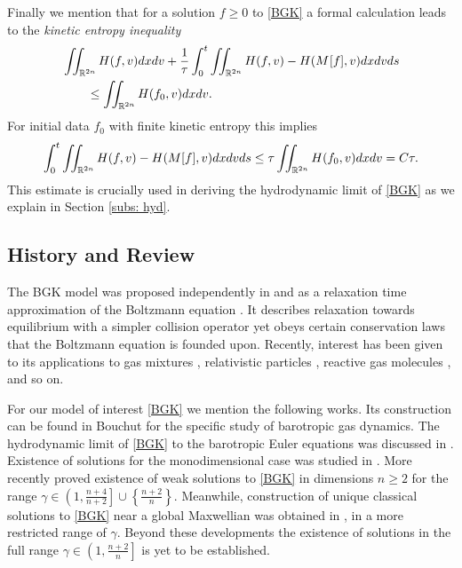 \documentclass{amsart}
\theoremstyle{plain}
\theoremstyle{remark}
\numberwithin{equation}{section}
\newcommand{\R}{\mathbb{R}}
\newcommand{\dx}{\textnormal{d}x}
\newcommand{\dv}{\textnormal{d}v}
\newcommand{\ds}{\textnormal{d}s}
\begin{document}
Finally we mention that for a solution $f\ge 0$ to \eqref{BGK} a formal calculation leads to the \emph{kinetic entropy inequality}
\begin{equation}
    \label{eq : kin entrop ineq}
    \begin{split}
          &\iint_{\R^{2n}} H(f,v)\dx \dv + \frac{1}{\tau}\int_0^t \iint_{\R^{2n}} H(f,v)-H(M^{}[f],v) \dx \dv \ds\\
          &\qquad \le \iint_{\R^{2n}}H(f_0,v)\dx\dv.
        \end{split}
\end{equation}
For initial data $f_0$ with finite kinetic entropy this implies
    \begin{align}
    \label{ineq : dissipation est}
        \int_0^t \iint_{\R^{2n}} H(f,v)-H(M[f],v) \dx \dv \ds \le \tau \iint_{\R^{2n}} H(f_0,v) \dx \dv = C\tau.
    \end{align}
This estimate is crucially used in deriving the hydrodynamic limit of \eqref{BGK} as we explain in Section \ref{subs: hyd}.

\subsection{History and Review}
The BGK model was proposed independently in \cite{bhatnagargrosskrook1954} and \cite{walender1954} as a relaxation time approximation of the Boltzmann equation \cite{boltzmann1995}. It describes relaxation towards equilibrium with a simpler collision operator yet obeys certain conservation laws that the Boltzmann equation is founded upon. Recently, interest has been given to its applications to gas mixtures \cite{andriesaokiperthame2002, baeklingenbergpirneryun2021, bobylevbisigroppispigapotapenko2018, brullpavanschneider2012, klingenbergpirnerpuppo2017}, relativistic particles \cite{andersonwitting1974, pennisiruggeri2018}, reactive gas molecules \cite{kimleeyun2021}, and so on.

For our model of interest \eqref{BGK} we mention the following works. Its construction can be found in Bouchut \cite{bouchut1999} for the specific study of barotropic gas dynamics. The hydrodynamic limit of \eqref{BGK} to the barotropic Euler equations was discussed in \cite{berthelinbouchut2002,berthelinvasseur2005}. Existence of solutions for the monodimensional case was studied in \cite{berthelinbouchut2000}. More recently \cite{choihwang2024} proved existence of weak solutions to \eqref{BGK} in dimensions $n\ge 2$ for the range $\gamma \in \left(1,\frac{n+4}{n+2}\right]\cup \left\{\frac{n+2}{n}\right\}$. Meanwhile, construction of unique classical solutions to \eqref{BGK} near a global Maxwellian was obtained in \cite{hwang2024}, in a more restricted range of $\gamma$. Beyond these developments the existence of solutions in the full range $\gamma\in\left(1,\frac{n+2}{n}\right]$ is yet to be established.
\end{document}
